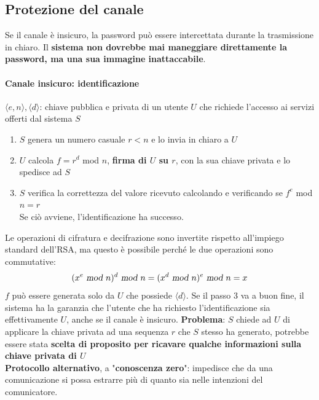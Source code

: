 \documentclass[10pt]{book}
\begin{document}
\subsection{Protezione del canale}
Se il canale è insicuro, la password può essere intercettata durante la trasmissione in chiaro. Il \textbf{sistema non dovrebbe mai maneggiare direttamente la password, ma una sua immagine inattaccabile}.
\paragraph{Canale insicuro: identificazione} $\langle e,n\rangle,\langle d\rangle$: chiave pubblica e privata di un utente $U$ che richiede l'accesso ai servizi offerti dal sistema $S$
\begin{enumerate}
	\item $S$ genera un numero casuale $r < n$ e lo invia in chiaro a $U$
	\item $U$ calcola $f = r^d$ mod $n$, \textbf{firma di $U$ su $r$}, con la sua chiave privata e lo spedisce ad $S$
	\item $S$ verifica la correttezza del valore ricevuto calcolando e verificando se $f^e$ mod $n = r$\\
	Se ciò avviene, l'identificazione ha successo.
\end{enumerate}
Le operazioni di cifratura e decifrazione sono invertite rispetto all'impiego standard dell'RSA, ma questo è possibile perché le due operazioni sono commutative:
$$(x^e\textsl{ mod }n)^d\textsl{ mod }n = (x^d\textsl{ mod }n)^e\textsl{ mod }n = x$$
$f$ può essere generata solo da $U$ che possiede $\langle d\rangle$. Se il passo 3 va a buon fine, il sistema ha la garanzia che l'utente che ha richiesto l'identificazione sia effettivamente $U$, anche se il canale è insicuro.
\textbf{Problema}: $S$ chiede ad $U$ di applicare la chiave privata ad una sequenza $r$ che $S$ stesso ha generato, potrebbe essere stata \textbf{scelta di proposito per ricavare qualche informazioni sulla chiave privata di $U$}\\
\textbf{Protocollo alternativo}, a "\textbf{conoscenza zero}": impedisce che da una comunicazione si possa estrarre più di quanto sia nelle intenzioni del comunicatore.
\pagebreak
\end{document}
